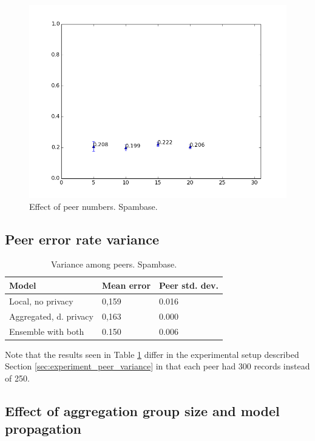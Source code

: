 \begin{figure}[H]
	\centering
	\includegraphics[width=\textwidth]{fig/spambase/eps1.0,bud1.0,peers5-30,groups5,reg2e-2-puball-peercounts-data150-spam-testmean}
	\caption{Effect of peer numbers. Spambase.}
	\label{fig:peer_range_constant_group_spam}
\end{figure}


\subsection{Peer error rate variance}

\begin{table}[H]
	\centering
	
	\begin{tabular}{|l|l|l|}
		\textbf{Model}                  & \textbf{Mean error} & \textbf{Peer std. dev.} \\
		\hline
		Local, no privacy      & 0,159 & 0.016 \\
		Aggregated, d. privacy & 0,163 & 0.000	 \\
		Ensemble with both & 0.150 & 0.006 \\
	\end{tabular}
	\caption{Variance among peers. Spambase.}
	\label{table:peer_variance_spam}
\end{table}

Note that the results seen in Table \ref{table:peer_variance_spam} differ in the experimental setup described Section \ref{sec:experiment_peer_variance} in that each peer had 300 records instead of 250.

\subsection{Effect of aggregation group size and model propagation}


